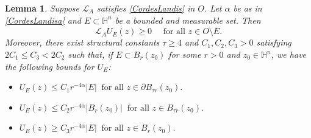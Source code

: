 \documentclass[12pt]{amsart}
\newtheorem{Lemma}[Theorem]{Lemma}
\def \Hn {{\mathbb H}^n}
\def \L {\mathcal{L}}
\def \a {\alpha}
\def \t {\tau}
\begin{document}
\begin{Lemma}\label{subsolutionUbounded}
Suppose $\L_A$ satisfies \eqref{CordesLandis} in $O$. Let $\a$ be as in \eqref{CordesLandisa} and $E \subset \Hn$ be a bounded and measurable set. Then
\begin{equation}\label{subsolutionH}
\L_A U_E(z) \geq 0 \quad\mbox{ for all }z\in O\setminus  \overline{E}.
\end{equation}
Moreover, there exist structural constants $\t\geq 4$ and $C_1, C_2, C_3 > 0$ satisfying $2C_1 \leq C_3<2C_2$ such that, if $E \subset B_r(z_0)$ for some $r>0$ and $z_0\in\Hn$, we have the following bounds for $U_E$:
\begin{itemize}
\item[(i)] $U_E(z) \leq C_1 r^{-4\a}|E| \ \text{ for all } z \in \partial B_{\t r}(z_0).$
\item[(ii)] $U_E(z) \leq C_2 r^{-4\a} |B_r(z_0)| \ \text{ for all } z \in B_{\t r}(z_0).$
\item[(iii)] $U_E(z) \geq C_3 r^{-4\a}|E| \ \text{ for all } z \in B_r(z_0).$
\end{itemize}
\end{Lemma}
\end{document}
